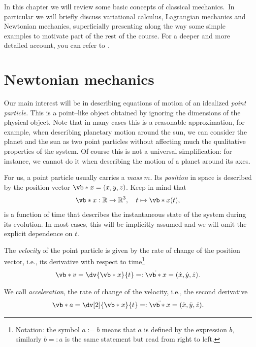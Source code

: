 \documentclass[english,fontsize=11pt,paper=b5]{scrbook}
\theoremstyle{definition}
\begin{document}
  In this chapter we will review some basic concepts of classical mechanics.\
  In particular we will briefly discuss variational calculus, Lagrangian mechanics and Newtonian mechanics, superficially presenting along the way some simple examples to motivate part of the rest of the course.
  For a deeper and more detailed account, you can refer to \cite{book:arnold,book:knauf}.

  \section{Newtonian mechanics}

  Our main interest will be in describing equations of motion of an idealized \emph{point particle}.
  This is a point--like object obtained by ignoring the dimensions of the physical object. Note that in many cases this is a reasonable approximation, for example, when describing planetary motion around the sun, we can consider the planet and the sun as two point particles without affecting much the qualitative properties of the system.
  Of course this is not a universal simplification: for instance, we cannot do it when describing the motion of a planet around its axes.

  For us, a point particle usually carries a \emph{mass} $m$.
  Its \emph{position} in space is described by the position vector $\vb*{x} = (x, y ,z)$.
  Keep in mind that
  \begin{equation}
    \vb*{x} : \mathbb{R}\to\mathbb{R}^3,\quad t \mapsto \vb*{x}(t),
  \end{equation}
  is a function of time that describes the instantaneous state of the system during its evolution.
  In most cases, this will be implicitly assumed and we will omit the explicit dependence on $t$.

  The \emph{velocity} of the point particle is given by the rate of change of the position vector,
  i.e., its derivative with respect to time\footnote{Notation: the symbol $a := b$ means that $a$ is defined by the expression $b$, similarly $b =: a$ is the same statement but read from right to left.} 
  \begin{equation}
    \vb*{v} = \dv{\vb*{x}}{t} =: \dot{\vb*{x}} = (\dot{x}, \dot{y}, \dot{z}).
  \end{equation}

  We call \emph{acceleration}, the rate of change of the velocity, i.e., the second derivative
  \begin{equation}
    \vb*{a} = \dv[2]{\vb*{x}}{t} =: \ddot{\vb*{x}} = (\ddot{x}, \ddot{y}, \ddot{z}).
  \end{equation}
\end{document}
